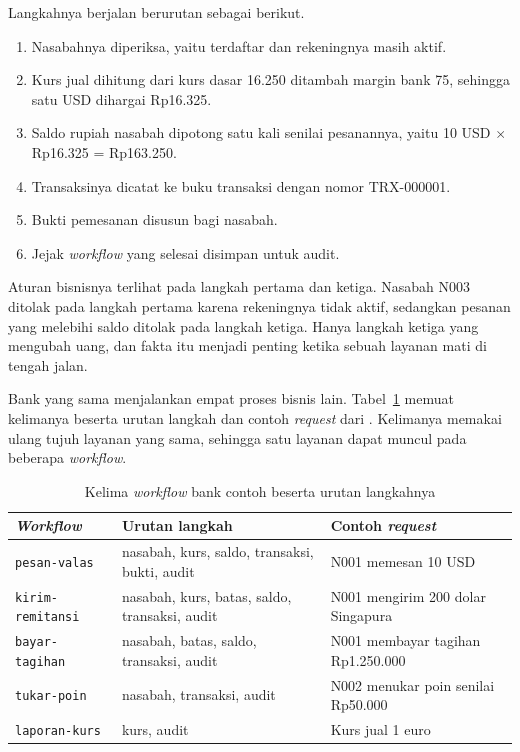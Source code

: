 Langkahnya berjalan berurutan sebagai berikut.

\begin{enumerate}
  \item Nasabahnya diperiksa, yaitu terdaftar dan rekeningnya masih aktif.
  \item Kurs jual dihitung dari kurs dasar 16.250 ditambah margin bank 75,
    sehingga satu USD dihargai Rp16.325.
  \item Saldo rupiah nasabah dipotong satu kali senilai pesanannya, yaitu
    10 USD $\times$ Rp16.325 = Rp163.250.
  \item Transaksinya dicatat ke buku transaksi dengan nomor TRX-000001.
  \item Bukti pemesanan disusun bagi nasabah.
  \item Jejak \textit{workflow} yang selesai disimpan untuk audit.
\end{enumerate}

Aturan bisnisnya terlihat pada langkah pertama dan ketiga. Nasabah N003 ditolak
pada langkah pertama karena rekeningnya tidak aktif, sedangkan pesanan yang
melebihi saldo ditolak pada langkah ketiga. Hanya langkah ketiga yang mengubah
uang, dan fakta itu menjadi penting ketika sebuah layanan mati di tengah jalan.

Bank yang sama menjalankan empat proses bisnis lain. Tabel~\ref{tab:alur-odsoa}
memuat kelimanya beserta urutan langkah dan contoh \textit{request} dari
. Kelimanya memakai ulang tujuh layanan
yang sama, sehingga satu layanan dapat muncul pada beberapa \textit{workflow}.

\begin{table}[htbp]
  \centering
  \caption{Kelima \textit{workflow} bank contoh beserta urutan langkahnya}
  \label{tab:alur-odsoa}
  \begin{tabularx}{\textwidth}{|l|p{5.5cm}|>{\raggedright\arraybackslash}X|}
    \hline
    \textbf{\textit{Workflow}} & \textbf{Urutan langkah} & \textbf{Contoh \textit{request}} \\
    \hline
    \texttt{pesan-valas} & nasabah, kurs, saldo, transaksi, bukti, audit & N001 memesan 10 USD \\
    \hline
    \texttt{kirim-remitansi} & nasabah, kurs, batas, saldo, transaksi, audit & N001 mengirim 200 dolar Singapura \\
    \hline
    \texttt{bayar-tagihan} & nasabah, batas, saldo, transaksi, audit & N001 membayar tagihan Rp1.250.000 \\
    \hline
    \texttt{tukar-poin} & nasabah, transaksi, audit & N002 menukar poin senilai Rp50.000 \\
    \hline
    \texttt{laporan-kurs} & kurs, audit & Kurs jual 1 euro \\
    \hline
  \end{tabularx}
\end{table}

